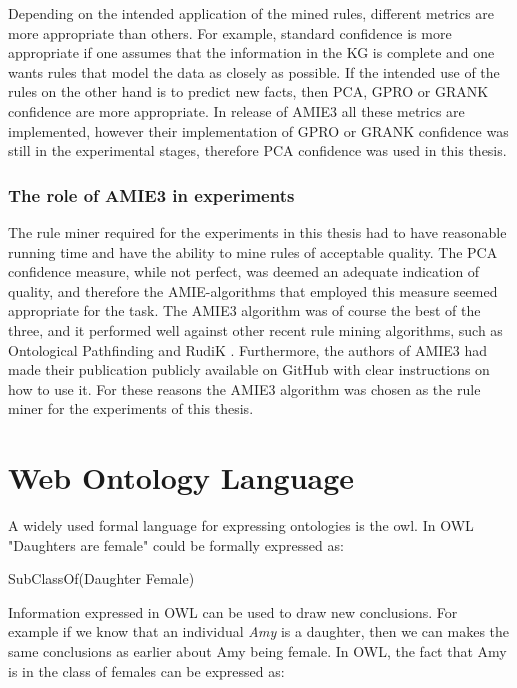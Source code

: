 Depending on the intended application of the mined rules, different metrics are more appropriate than others. For example, standard confidence is more appropriate if one assumes that the information in the KG is complete and one wants rules that model the data as closely as possible. If the intended use of the rules on the other hand is to predict new facts, then PCA, GPRO or GRANK confidence are more appropriate. In release of AMIE3 all these metrics are implemented, however their implementation of GPRO or GRANK confidence was still in the experimental stages, therefore PCA confidence was used in this thesis.


\subsubsection{The role of AMIE3 in experiments}
The rule miner required for the experiments in this thesis had to have reasonable running time and have the ability to mine rules of acceptable quality. The PCA confidence measure, while not perfect, was deemed an adequate indication of quality, and therefore the AMIE-algorithms that employed this measure seemed appropriate for the task. The AMIE3 algorithm was of course the best of the three, and it performed well against other recent rule mining algorithms, such as Ontological Pathfinding \cite{op} and RudiK \cite{rudik}. Furthermore, the authors of AMIE3 had made their publication publicly available on GitHub with clear instructions on how to use it. For these reasons the AMIE3 algorithm was chosen as the rule miner for the experiments of this thesis.








\iffalse 
\section{Web Ontology Language}
A widely used formal language for expressing ontologies is the \gls{owl}. In OWL "Daughters are female" could be formally expressed as:

\centerline{\textsf{SubClassOf(Daughter Female)}}
Information expressed in OWL can be used to draw new conclusions. For example if we know that an individual \emph{Amy} is a daughter, then we can makes the same conclusions as earlier about Amy being female. In OWL, the fact that Amy is in the class of females can be expressed as:

